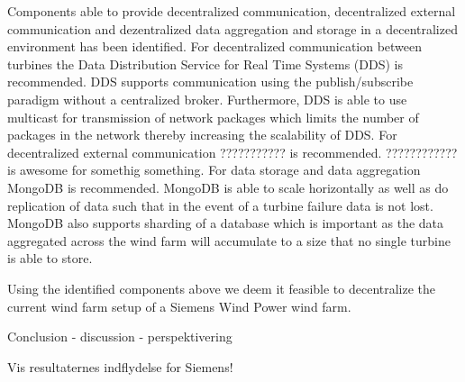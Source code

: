 Components able to provide decentralized communication, decentralized external communication and dezentralized data aggregation and storage in a decentralized environment has been identified. For decentralized communication between turbines the Data Distribution Service for Real Time Systems (DDS) is recommended. DDS supports communication using the publish/subscribe paradigm without a centralized broker. Furthermore, DDS is able to use multicast for transmission of network packages which limits the number of packages in the network thereby increasing the scalability of DDS. For decentralized external communication ??????????? is recommended. ???????????? is awesome for somethig something. For data storage and data aggregation MongoDB is recommended. MongoDB is able to scale horizontally as well as do replication of data such that in the event of a turbine failure data is not lost. MongoDB also supports sharding of a database which is important as the data aggregated across the wind farm will accumulate to a size that no single turbine is able to store.

Using the identified components above we deem it feasible to decentralize the current wind farm setup of a Siemens Wind Power wind farm.


Conclusion - discussion - perspektivering

Vis resultaternes indflydelse for Siemens!
